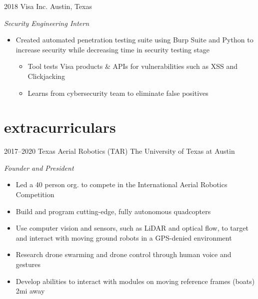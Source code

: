 \documentclass[]{friggeri-cv} %
\begin{document}
\begin{entrylist}
	
	\entry
	{2018}
	{Visa Inc.}
	{Austin, Texas}
	{\emph{Security Engineering Intern}
		\begin{itemize}
			\item Created automated penetration testing suite using Burp Suite and Python to increase security while decreasing time in security testing stage
			\begin{itemize}
				\item Tool tests Visa products \& APIs for vulnerabilities such as XSS and Clickjacking
				\item Learns from cybersecurity team to eliminate false positives
			\end{itemize}
		\end{itemize}
	}

\end{entrylist}

\vspace{-15pt}
\section{extracurriculars}
\vspace{-10pt}

\begin{entrylist}
	
	\entry
	{2017--2020}
	{Texas Aerial Robotics (TAR)}
	{The University of Texas at Austin}
	{
		\emph{Founder and President}
		\begin{itemize}
			\item Led a 40 person org. to compete in the International Aerial Robotics Competition
			\item Build and program cutting-edge, fully autonomous quadcopters
			\item Use computer vision and sensors, such as LiDAR and optical flow, to target and interact with moving ground robots in a GPS-denied environment
			\item Research drone swarming and drone control through human voice and gestures
			\item Develop abilities to interact with modules on moving reference frames (boats) 2mi away
		\end{itemize}
	}
	
\end{entrylist}

\vspace{-25pt}
\end{document}
